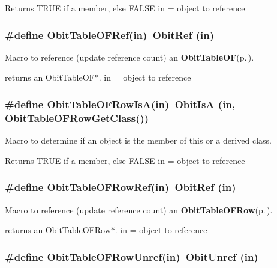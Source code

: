 Returns TRUE if a member, else FALSE in = object to reference 
\subsubsection{\setlength{\rightskip}{0pt plus 5cm}\#define Obit\-Table\-OFRef(in)\ Obit\-Ref (in)}\label{ObitTableOF_8h_a2}


Macro to reference (update reference count) an {\bf Obit\-Table\-OF}{\rm (p.\,\pageref{structObitTableOF})}. 

returns an Obit\-Table\-OF$\ast$. in = object to reference 
\subsubsection{\setlength{\rightskip}{0pt plus 5cm}\#define Obit\-Table\-OFRow\-Is\-A(in)\ Obit\-Is\-A (in, Obit\-Table\-OFRow\-Get\-Class())}\label{ObitTableOF_8h_a6}


Macro to determine if an object is the member of this or a derived class. 

Returns TRUE if a member, else FALSE in = object to reference 
\subsubsection{\setlength{\rightskip}{0pt plus 5cm}\#define Obit\-Table\-OFRow\-Ref(in)\ Obit\-Ref (in)}\label{ObitTableOF_8h_a5}


Macro to reference (update reference count) an {\bf Obit\-Table\-OFRow}{\rm (p.\,\pageref{structObitTableOFRow})}. 

returns an Obit\-Table\-OFRow$\ast$. in = object to reference 
\subsubsection{\setlength{\rightskip}{0pt plus 5cm}\#define Obit\-Table\-OFRow\-Unref(in)\ Obit\-Unref (in)}\label{ObitTableOF_8h_a4}


